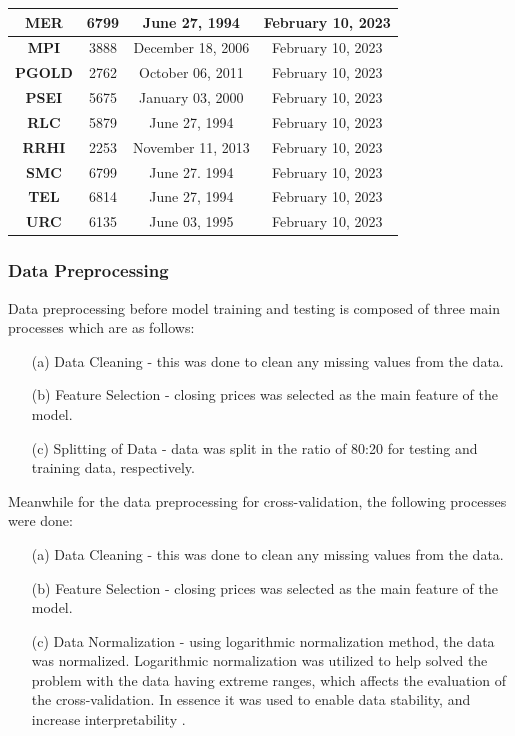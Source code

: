 \begin{longtable}{|c|c|c|c|}
    \textbf{MER}   & 6799                & June 27, 1994       & February 10, 2023 \\ \hline
    \textbf{MPI}   & 3888                & December 18, 2006   & February 10, 2023 \\ \hline
    \textbf{PGOLD} & 2762                & October 06, 2011    & February 10, 2023 \\ \hline
    \rowcolor[HTML]{9AFF99} 
    \textbf{PSEI}  & 5675                & January 03, 2000    & February 10, 2023 \\ \hline
    \textbf{RLC}   & 5879                & June 27, 1994       & February 10, 2023 \\ \hline
    \textbf{RRHI}  & 2253                & November 11, 2013   & February 10, 2023 \\ \hline
    \textbf{SMC}   & 6799                & June 27. 1994       & February 10, 2023 \\ \hline
    \textbf{TEL}   & 6814                & June 27, 1994       & February 10, 2023 \\ \hline
    \textbf{URC}   & 6135                & June 03, 1995       & February 10, 2023 \\ \hline
\end{longtable}

\subsubsection{Data Preprocessing}
\label{subsubsec:model_data_processing}
Data preprocessing before model training and testing is composed of three main processes which are as follows:
\begin{itemize}
    \item[(a)] Data Cleaning - this was done to clean any missing values from the data.
    \item[(b)] Feature Selection - closing prices was selected as the main feature of the model.
    \item[(c)] Splitting of Data - data was split in the ratio of 80:20 for testing and training data, respectively.
\end{itemize}

Meanwhile for the data preprocessing for cross-validation, the following processes were done:
\begin{itemize}
    \item[(a)] Data Cleaning - this was done to clean any missing values from the data.
    \item[(b)] Feature Selection - closing prices was selected as the main feature of the model.
    \item[(c)] Data Normalization - using logarithmic normalization method, the data was normalized.
    Logarithmic normalization was utilized to help solved the problem with the data having extreme ranges,
    which affects the evaluation of the cross-validation. In essence it was used to enable data stability, and
    increase interpretability \cite{Baeldung2022, Bex2021, Andrew2019}.
\end{itemize}

